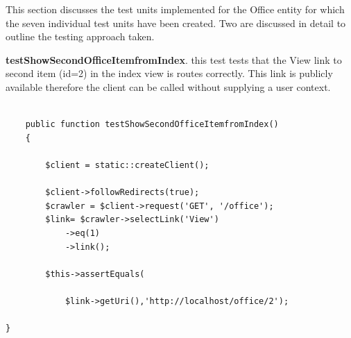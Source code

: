 \documentclass[a4paper,12pt]{article}
\begin{document}
This section discusses the test units implemented for the Office entity for which the seven individual test units have been created. Two are discussed in detail to outline the testing approach taken.


\textbf{testShowSecondOfficeItemfromIndex}. this test tests that the View link to second item (id=2) in the index view is routes correctly. This link is publicly available therefore the client can be called without supplying a user context.
\begin{verbatim}

    public function testShowSecondOfficeItemfromIndex()
    {

        $client = static::createClient();

        $client->followRedirects(true);
        $crawler = $client->request('GET', '/office');
        $link= $crawler->selectLink('View')
            ->eq(1)
            ->link();

        $this->assertEquals(

            $link->getUri(),'http://localhost/office/2');

}
\end{verbatim}
\end{document}
